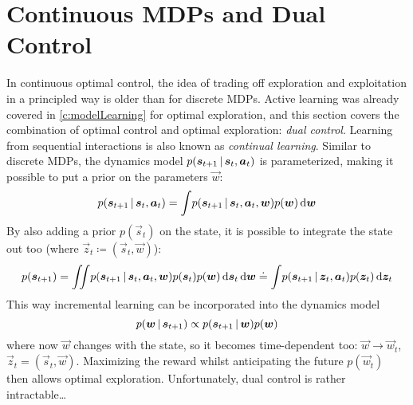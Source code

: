 	\section{Continuous MDPs and Dual Control}
		In continuous optimal control, the idea of trading off exploration and exploitation in a principled way is older than for discrete MDPs. Active learning was already covered in \autoref{c:modelLearning} for optimal exploration, and this section covers the combination of optimal control and optimal exploration: \emph{dual control}. Learning from sequential interactions is also known as \emph{continual learning}. Similar to discrete MDPs, the dynamics model \( p(\bm{s}_{t + 1} \,\vert\, \bm{s}_t, \bm{a}_t) \) is parameterized, making it possible to put a prior on the parameters \(\vec{w}\):
		\begin{equation*}
			p(\bm{s}_{t + 1} \,\vert\, \bm{s}_t, \bm{a}_t) = \int\! p(\bm{s}_{t + 1} \,\vert\, \bm{s}_t, \bm{a}_t, \bm{w}) p(\bm{w}) \dd{\bm{w}}
		\end{equation*}
		By also adding a prior \(p(\vec{s}_t)\) on the state, it is possible to integrate the state out too (where \( \vec{z}_t \coloneqq (\vec{s}_t, \vec{w}) \)):
		\begin{equation*}
			p(\bm{s}_{t + 1})
			= \iint\! p(\bm{s}_{t + 1} \,\vert\, \bm{s}_t, \bm{a}_t, \bm{w}) p(\bm{s}_t) p(\bm{w}) \dd{\bm{s}_t} \dd{\bm{w}}
			\doteq \int\! p(\bm{s}_{t + 1} \,\vert\, \bm{z}_t, \bm{a}_t) p(\bm{z}_t) \dd{\bm{z}_t}
		\end{equation*}
		This way incremental learning can be incorporated into the dynamics model
		\begin{equation*}
			p(\bm{w} \,\vert\, \bm{s}_{t + 1}) \propto p(\bm{s}_{t + 1} \,\vert\, \bm{w}) p(\bm{w})
		\end{equation*}
		where now \( \vec{w} \) changes with the state, so it becomes time-dependent too: \( \vec{w} \to \vec{w}_t \), \( \vec{z}_t = (\vec{s}_t, \vec{w}) \). Maximizing the reward whilst anticipating the future \( p(\vec{w}_t) \) then allows optimal exploration. Unfortunately, dual control is rather intractable\dots


